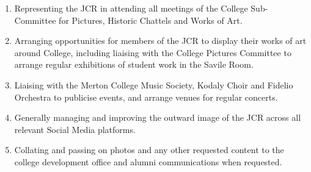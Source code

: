 \begin{enumerate}
	\item Representing the JCR in attending all meetings of the College Sub-Committee for Pictures, Historic Chattels and Works of Art. 
	\item Arranging opportunities for members of the JCR to display their works of art around College, including liaising with the College Pictures Committee to arrange regular exhibitions of student work in the Savile Room.
	\item Liaising with the Merton College Music Society, Kodaly Choir and Fidelio Orchestra to publicise events, and arrange venues for regular concerts.
	\item Generally managing and improving the outward image of the JCR across all relevant Social Media platforms.
	\item Collating and passing on photos and any other requested content to the college development office and alumni communications when requested.
\end{enumerate}
